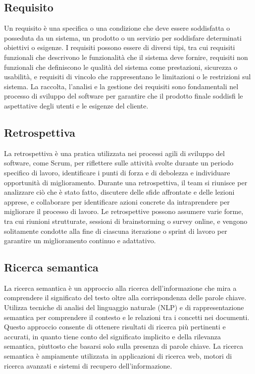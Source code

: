 \vspace{2em}
\subsection*{Requisito}
Un requisito è una specifica o una condizione che deve essere soddisfatta o posseduta da un sistema, un prodotto o un servizio per soddisfare determinati obiettivi o esigenze. I requisiti possono essere di diversi tipi, tra cui requisiti funzionali che descrivono le funzionalità che il sistema deve fornire, requisiti non funzionali che definiscono le qualità del sistema come prestazioni, sicurezza o usabilità, e requisiti di vincolo che rappresentano le limitazioni o le restrizioni sul sistema. La raccolta, l'analisi e la gestione dei requisiti sono fondamentali nel processo di sviluppo del software per garantire che il prodotto finale soddisfi le aspettative degli utenti e le esigenze del cliente.

\vspace{2em}
\subsection*{Retrospettiva}
La retrospettiva è una pratica utilizzata nei processi agili di sviluppo del software, come Scrum, per riflettere sulle attività svolte durante un periodo specifico di lavoro, identificare i punti di forza e di debolezza e individuare opportunità di miglioramento. Durante una retrospettiva, il team si riunisce per analizzare ciò che è stato fatto, discutere delle sfide affrontate e delle lezioni apprese, e collaborare per identificare azioni concrete da intraprendere per migliorare il processo di lavoro. Le retrospettive possono assumere varie forme, tra cui riunioni strutturate, sessioni di brainstorming o survey online, e vengono solitamente condotte alla fine di ciascuna iterazione o sprint di lavoro per garantire un miglioramento continuo e adattativo.

\vspace{2em}
\subsection*{Ricerca semantica}
La ricerca semantica è un approccio alla ricerca dell'informazione che mira a comprendere il significato del testo oltre alla corrispondenza delle parole chiave. Utilizza tecniche di analisi del linguaggio naturale (NLP) e di rappresentazione semantica per comprendere il contesto e le relazioni tra i concetti nei documenti. Questo approccio consente di ottenere risultati di ricerca più pertinenti e accurati, in quanto tiene conto del significato implicito e della rilevanza semantica, piuttosto che basarsi solo sulla presenza di parole chiave. La ricerca semantica è ampiamente utilizzata in applicazioni di ricerca web, motori di ricerca avanzati e sistemi di recupero dell'informazione.

